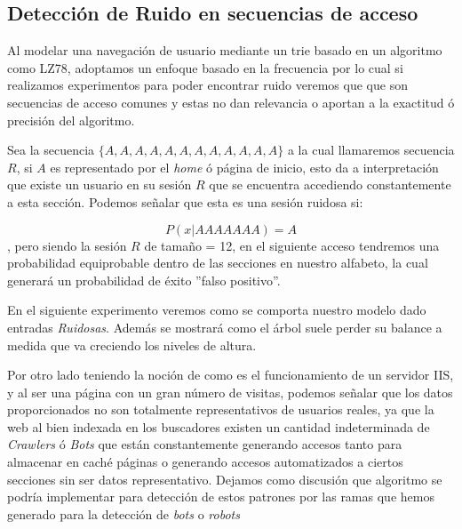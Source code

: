 


\subsection{Detección de Ruido en secuencias de acceso}

Al modelar una navegación de usuario mediante un trie basado en un algoritmo como LZ78, adoptamos un enfoque basado en la frecuencia por lo cual si realizamos experimentos para poder encontrar ruido veremos que que son secuencias de acceso comunes y estas no dan relevancia o aportan a la exactitud ó precisión del algoritmo.

Sea la secuencia $\{A,A,A,A,A,A,A,A,A,A,A,A \}$ a la cual llamaremos secuencia $R$, si $A$ es representado por el \emph{home} ó página de inicio, esto da a interpretación que existe un usuario en su sesión $R$ que se encuentra accediendo constantemente a esta sección. Podemos señalar que esta es una sesión ruidosa si:

\begin{equation}
	P( x | AAAAAAA)= A	
\end{equation}, pero siendo la sesión $R$ de tamaño = 12, en el siguiente acceso tendremos una probabilidad equiprobable dentro de las secciones en nuestro alfabeto, la cual generará un probabilidad de éxito ''falso positivo''.

En el siguiente experimento veremos como se comporta nuestro modelo dado entradas \emph{Ruidosas}. Además se mostrará como el árbol suele perder su balance a medida que va creciendo los niveles de altura. 



Por otro lado teniendo la noción de como es el funcionamiento de un servidor IIS, y al ser una página con un gran número de visitas, podemos señalar que los datos proporcionados no son totalmente representativos de usuarios reales, ya que la web al bien indexada en los buscadores existen un cantidad indeterminada de \emph{Crawlers} ó \emph{Bots} que están constantemente generando accesos tanto para almacenar en caché páginas o generando accesos automatizados a ciertos secciones sin ser datos representativo. Dejamos como discusión que algoritmo se podría implementar para detección de estos patrones por las ramas que hemos generado para la detección de \emph{bots} o \emph{robots}



